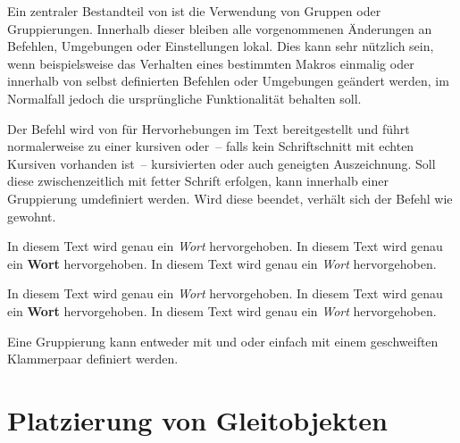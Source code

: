 %
Ein zentraler Bestandteil von  ist die Verwendung von Gruppen 
oder Gruppierungen. Innerhalb dieser bleiben alle vorgenommenen Änderungen an 
Befehlen, Umgebungen oder Einstellungen lokal. Dies kann sehr nützlich sein, 
wenn beispielsweise das Verhalten eines bestimmten Makros einmalig oder 
innerhalb von selbst definierten Befehlen oder Umgebungen geändert werden, im 
Normalfall jedoch die ursprüngliche Funktionalität behalten soll.
%
\begin{Example}
%
Der Befehl  wird von  für Hervorhebungen im Text 
bereitgestellt und führt normalerweise zu einer kursiven oder~-- falls kein 
Schriftschnitt mit echten Kursiven vorhanden ist~-- kursivierten oder auch 
geneigten Auszeichnung. Soll diese zwischenzeitlich mit fetter Schrift 
erfolgen, kann  innerhalb einer Gruppierung umdefiniert werden. 
Wird diese beendet, verhält sich der Befehl wie gewohnt.
\begin{Code}
In diesem Text wird genau ein \emph{Wort} hervorgehoben.
\begingroup
  \renewcommand*{\emph}[1]{\textbf{#1}}%
  In diesem Text wird genau ein \emph{Wort} hervorgehoben.
\endgroup
In diesem Text wird genau ein \emph{Wort} hervorgehoben.
\end{Code}
In diesem Text wird genau ein \emph{Wort} hervorgehoben.
\begingroup
  \renewcommand*{\emph}[1]{\textbf{#1}}%
  In diesem Text wird genau ein \emph{Wort} hervorgehoben.
\endgroup
In diesem Text wird genau ein \emph{Wort} hervorgehoben.
\end{Example}
%
Eine Gruppierung kann entweder mit  und  
oder einfach mit einem geschweiften Klammerpaar \MPValue{\dots} definiert 
werden.



\section{%
  Platzierung von Gleitobjekten%
  \label{sec:tips:floats}%
}


